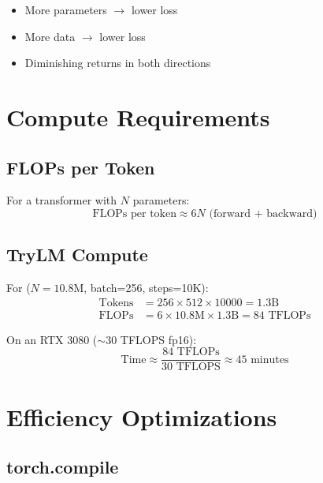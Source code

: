 \begin{itemize}
    \item More parameters $\to$ lower loss
    \item More data $\to$ lower loss
    \item Diminishing returns in both directions
\end{itemize}

\section{Compute Requirements}

\subsection{FLOPs per Token}

For a transformer with $N$ parameters:
\begin{equation}
\text{FLOPs per token} \approx 6N \text{ (forward + backward)}
\end{equation}

\subsection{TryLM Compute}

For \TryLM ($N = 10.8$M, batch=256, steps=10K):
\begin{align*}
\text{Tokens} &= 256 \times 512 \times 10000 = 1.3\text{B} \\
\text{FLOPs} &= 6 \times 10.8\text{M} \times 1.3\text{B} = 84 \text{ TFLOPs}
\end{align*}

On an RTX 3080 ($\sim$30 TFLOPS fp16):
\[
\text{Time} \approx \frac{84 \text{ TFLOPs}}{30 \text{ TFLOPS}} \approx 45 \text{ minutes}
\]

\section{Efficiency Optimizations}

\subsection{torch.compile}

